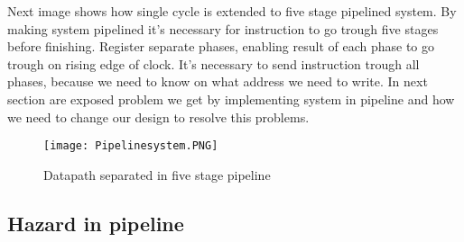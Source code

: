 \documentclass{scrreprt}
\begin{document}
        Next image shows how single cycle is extended to five stage pipelined system. By making system pipelined it's necessary for instruction to go trough five stages before finishing. Register separate phases, enabling result of each phase to go trough on rising edge of clock. It's necessary to send instruction trough all phases, because we need to know on what address we need to write. In next section are exposed problem we get by implementing system in pipeline and how we need to change our design to resolve this problems.  
        \begin{figure}[htb!]
            \centering
            \texttt{[image: Pipelinesystem.PNG]}
            \caption{Datapath separated in five stage pipeline}
            \label{fig:pipeline system}
        \end{figure}
        \newpage
        \subsection*{Hazard in pipeline}
\end{document}
